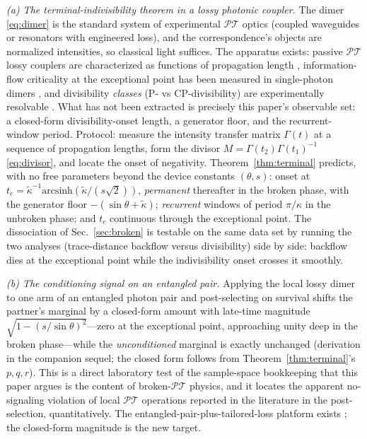 \documentclass[11pt]{article}
\theoremstyle{definition}
\theoremstyle{remark}
\newcommand{\PT}{\mathcal{PT}}
\newcommand{\Gam}{\Gamma}
\begin{document}
\emph{(a) The terminal-indivisibility theorem in a lossy photonic
coupler.} The dimer \eqref{eq:dimer} is the standard system of
experimental $\PT$ optics (coupled waveguides or resonators with
engineered loss), and the correspondence's objects are normalized
intensities, so classical light suffices. The apparatus exists:
passive $\PT$ lossy couplers are characterized as functions of
propagation length \cite{Klauck2019}, information-flow criticality
at the exceptional point has been measured in single-photon dimers
\cite{Xiao2019}, and divisibility \emph{classes} (P- vs
CP-divisibility) are experimentally resolvable \cite{Bernardes2015}.
What has not been extracted is precisely this paper's observable
set: a closed-form divisibility-onset length, a generator floor,
and the recurrent-window period. Protocol: measure the
intensity transfer matrix $\Gam(t)$ at a sequence of propagation
lengths, form the divisor $M=\Gam(t_2)\Gam(t_1)^{-1}$
\eqref{eq:divisor}, and locate the onset of negativity.
Theorem~\ref{thm:terminal} predicts, with no free parameters beyond
the device constants $(\theta,s)$: onset at
$t_c=\tilde\kappa^{-1}\mathrm{arcsinh}(\tilde\kappa/(s\sqrt2))$,
\emph{permanent} thereafter in the broken phase, with the generator
floor $-(\sin\theta+\tilde\kappa)$; \emph{recurrent} windows of
period $\pi/\kappa$ in the unbroken phase; and $t_c$ continuous
through the exceptional point. The dissociation of
Sec.~\ref{sec:broken} is testable on the same data set by running
the two analyses (trace-distance backflow versus divisibility) side
by side: backflow dies at the exceptional point while the
indivisibility onset crosses it smoothly.

\emph{(b) The conditioning signal on an entangled pair.} Applying
the local lossy dimer to one arm of an entangled photon pair and
post-selecting on survival shifts the partner's marginal by a
closed-form amount with late-time magnitude
$\sqrt{1-(s/\sin\theta)^{2}}$---zero at the exceptional point,
approaching unity deep in the broken phase---while the
\emph{unconditioned} marginal is exactly unchanged (derivation in
the companion sequel; the closed
form follows from Theorem~\ref{thm:terminal}'s $p,q,r$). This is a direct laboratory
test of the sample-space bookkeeping that this paper argues is the
content of broken-$\PT$ physics, and it locates the apparent
no-signaling violation of local $\PT$ operations reported in the
literature in the post-selection, quantitatively. The
entangled-pair-plus-tailored-loss platform exists
\cite{Tang2016,Ehrhardt2022}; the closed-form magnitude is the new
target.
\end{document}
